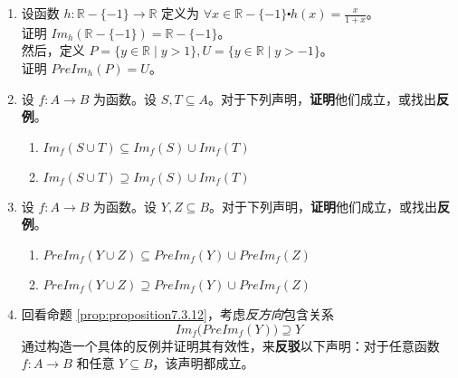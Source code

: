 \begin{enumerate}[label=(\arabic*)]
    \item 设函数 $h : \mathbb{R} - \{-1\} \to \mathbb{R}$ 定义为 $\forall x \in \mathbb{R} - \{-1\} \centerdot h(x) = \frac{x}{1+x}$。\\
        证明 $Im_h(\mathbb{R} - \{-1\}) = \mathbb{R} - \{-1\}$。\\
        然后，定义 $P = \{y \in \mathbb{R} \mid y > 1\}, U = \{y \in \mathbb{R} \mid y > -1\}$。 \\
        证明 $PreIm_h(P) = U$。
    \item 设 $f:A \to B$ 为函数。设 $S,T \subseteq A$。对于下列声明，\textbf{证明}他们成立，或找出\textbf{反例}。
        \begin{enumerate}[label=(\alph*)]
            \item $Im_f (S \cup T) \subseteq Im_f (S) \cup Im_f (T)$
            \item $Im_f (S \cup T) \supseteq Im_f (S) \cup Im_f (T)$
        \end{enumerate}
    \item 设 $f:A \to B$ 为函数。设 $Y,Z \subseteq B$。对于下列声明，\textbf{证明}他们成立，或找出\textbf{反例}。
        \begin{enumerate}[label=(\alph*)]
            \item $PreIm_f (Y \cup Z) \subseteq PreIm_f (Y) \cup PreIm_f (Z)$
            \item $PreIm_f (Y \cup Z) \supseteq PreIm_f (Y) \cup PreIm_f (Z)$
        \end{enumerate}
    \item 回看命题 \ref{prop:proposition7.3.12}，考虑\emph{反方向}包含关系
        \[Im_f \big(PreIm_f (Y)\big) \supseteq Y\]
        通过构造一个具体的反例并证明其有效性，来\textbf{反驳}以下声明：对于任意函数 $f : A \to B$ 和任意 $Y \subseteq B$，该声明都成立。
\end{enumerate}